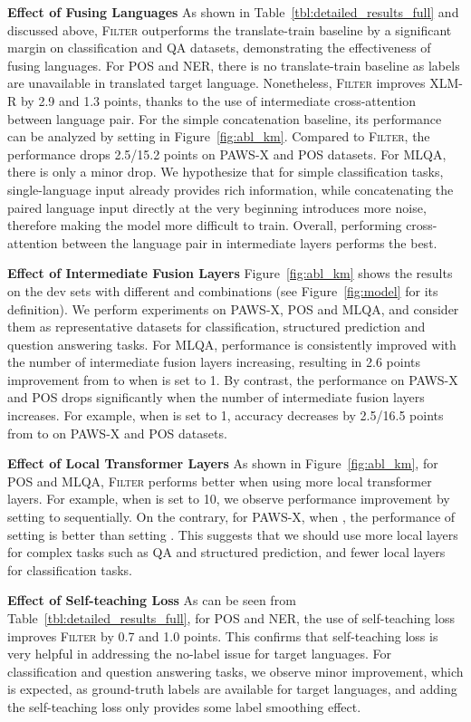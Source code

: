 \noindent\textbf{Effect of Fusing Languages} 
As shown in Table~\ref{tbl:detailed_results_full} and discussed above, \textsc{Filter} outperforms the translate-train baseline by a significant margin on classification and QA datasets, demonstrating the effectiveness of fusing languages. 
For POS and NER, there is no translate-train baseline as labels are unavailable in translated target language. 
Nonetheless, \textsc{Filter} improves XLM-R by 2.9 and 1.3 points, thanks to the use of intermediate cross-attention between language pair.
For the simple concatenation baseline, its performance can be analyzed by setting  in Figure~\ref{fig:abl_km}. Compared to \textsc{Filter}, the performance drops 2.5/15.2 points on PAWS-X and POS datasets.
For MLQA, there is only a minor drop.
We hypothesize that for simple classification tasks, single-language input already provides rich information, while concatenating the paired language input directly at the very beginning introduces more noise, therefore making the model more difficult to train.
Overall, performing cross-attention between the language pair in intermediate layers performs the best. 


\noindent\textbf{Effect of Intermediate Fusion Layers}
Figure~\ref{fig:abl_km} shows the results on the dev sets with different  and  combinations (see Figure~\ref{fig:model} for its definition). 
We perform experiments on PAWS-X, POS and MLQA, and consider them as representative datasets for classification, structured prediction and question answering tasks.
For MLQA, performance is consistently improved with the number of intermediate fusion layers increasing, resulting in 2.6 points improvement from  to  when  is set to 1.
By contrast, the performance on PAWS-X and POS drops significantly when the number of intermediate fusion layers increases.
For example, when  is set to 1, accuracy decreases by 2.5/16.5 points from  to  on PAWS-X and POS datasets.

\noindent\textbf{Effect of Local Transformer Layers}
As shown in Figure~\ref{fig:abl_km}, for POS and MLQA, \textsc{Filter} performs better when using more local transformer layers.
For example, when  is set to 10, we observe performance  improvement by setting  to  sequentially.
On the contrary, for PAWS-X, when , the performance of setting  is better than setting .
This suggests that we should use more local layers for complex tasks such as QA and structured prediction, and fewer local layers for classification tasks. 


\noindent\textbf{Effect of Self-teaching Loss}
As can be seen from Table~\ref{tbl:detailed_results_full}, for POS and NER, the use of self-teaching loss improves \textsc{Filter} by 0.7 and 1.0 points. This confirms that self-teaching loss is very helpful in addressing the no-label issue for target languages.
For classification and question answering tasks, we observe minor improvement, which is expected, as ground-truth labels are available for target languages, and adding the self-teaching loss only provides some label smoothing effect. 


